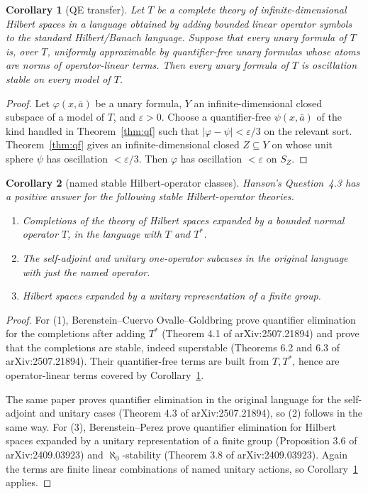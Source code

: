 \documentclass[11pt]{article}
\newtheorem{corollary}{Corollary}
\newcommand{\eps}{\varepsilon}
\begin{document}
\begin{corollary}[QE transfer]\label{cor:qe-transfer}
Let \(T\) be a complete theory of infinite-dimensional Hilbert spaces in a
language obtained by adding bounded linear operator symbols to the standard
Hilbert/Banach language.  Suppose that every unary formula of \(T\) is, over
\(T\), uniformly approximable by quantifier-free unary formulas whose atoms are
norms of operator-linear terms.  Then every unary formula of \(T\) is
oscillation stable on every model of \(T\).
\end{corollary}

\begin{proof}
Let \(\varphi(x,\bar a)\) be a unary formula, \(Y\) an infinite-dimensional
closed subspace of a model of \(T\), and \(\eps>0\).  Choose a quantifier-free
\(\psi(x,\bar a)\) of the kind handled in Theorem~\ref{thm:qf} such that
\(|\varphi-\psi|<\eps/3\) on the relevant sort.  Theorem~\ref{thm:qf} gives an
infinite-dimensional closed \(Z\subseteq Y\) on whose unit sphere \(\psi\) has
oscillation \(<\eps/3\).  Then \(\varphi\) has oscillation \(<\eps\) on
\(S_Z\).
\end{proof}

\begin{corollary}[named stable Hilbert-operator classes]\label{cor:named}
Hanson's Question~4.3 has a positive answer for the following stable
Hilbert-operator theories.
\begin{enumerate}
\item Completions of the theory of Hilbert spaces expanded by a bounded normal
operator \(T\), in the language with \(T\) and \(T^*\).
\item The self-adjoint and unitary one-operator subcases in the original
language with just the named operator.
\item Hilbert spaces expanded by a unitary representation of a finite group.
\end{enumerate}
\end{corollary}

\begin{proof}
For (1), Berenstein--Cuervo Ovalle--Goldbring prove quantifier elimination for
the completions after adding \(T^*\) (Theorem 4.1 of
arXiv:2507.21894) and prove that the completions are stable, indeed
superstable (Theorems 6.2 and 6.3 of arXiv:2507.21894).  Their quantifier-free
terms are built from \(T,T^*\), hence are operator-linear terms covered by
Corollary~\ref{cor:qe-transfer}.

The same paper proves quantifier elimination in the original language for the
self-adjoint and unitary cases (Theorem 4.3 of arXiv:2507.21894), so (2)
follows in the same way.  For (3), Berenstein--Perez prove quantifier
elimination for Hilbert spaces expanded by a unitary representation of a finite
group (Proposition 3.6 of arXiv:2409.03923) and \(\aleph_0\)-stability
(Theorem 3.8 of arXiv:2409.03923).  Again the terms are finite linear
combinations of named unitary actions, so Corollary~\ref{cor:qe-transfer}
applies.
\end{proof}
\end{document}
